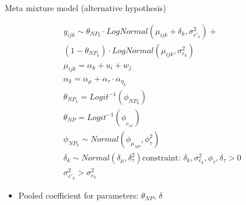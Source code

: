 \begin{frame}[fragile]{Meta mixture model (alternative hypothesis)}

	\begin{equation*}
		\begin{aligned}
		y_{ijk} \sim \theta_{{NP}_k} \cdot LogNormal(\mu_{ijk} + \delta_k, \sigma_{e'_k}^2) + \\
			(1 - \theta_{{NP}_k}) \cdot LogNormal(\mu_{ijk}, \sigma_{e_k}^2) \\
			\mu_{ijk} = \alpha_k + u_i + w_j\\
			\alpha_k = \alpha_{\mu} + \alpha_{\tau} \cdot \alpha_{\eta_k}\\
			\theta_{{NP}_k} = Logit^{-1}(\phi_{{NP}_k})\\
			\theta_{{NP}} = Logit^{-1}(\phi_{_{\mu_{NP}}})\\		
			\phi_{{NP}_k} \sim Normal(\phi_{\mu_{NP}}, \phi_{\tau}^2)\\
			\delta_k \sim Normal(\delta_{\mu}, \delta_{\tau}^2)
			\text{constraint: }\delta_k, \sigma_{e_k}^2, \phi_{\tau}, \delta_{\tau}>0\\
			\sigma_{e'_k}^2 > \sigma_{e_k}^2 
		\end{aligned}
	\end{equation*}
	
	\begin{small}	
		\begin{itemize}
			\item Pooled coefficient for parameters: $\theta_{NP}$, $\delta$
		\end{itemize}
	\end{small}
	
\end{frame}


